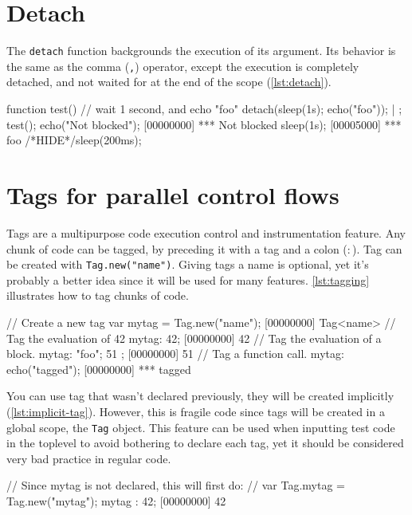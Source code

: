 \documentclass[openright,twoside,12pt]{report}
\begin{document}
\section{Detach}

The \texttt{detach} function backgrounds the execution of its
argument. Its behavior is the same as the comma (\texttt{,}) operator,
except the execution is completely detached, and not waited for at the
end of the scope (\autoref{lst:detach}).

\begin{urbiscript}[caption=Detach, label=lst:detach]
function test()
{
  // wait 1 second, and echo "foo"
  detach({sleep(1s); echo("foo")});
} | {};
test();
echo("Not blocked");
[00000000] *** Not blocked
sleep(1s);
[00005000] *** foo
/*HIDE*/sleep(200ms);
\end{urbiscript}

\section{Tags for parallel control flows}

Tags are a multipurpose code execution control and instrumentation
feature. Any chunk of code can be tagged, by preceding it with a tag
and a colon (\texttt{$:$}). Tag can be created with
\lstinline|Tag.new("name")|. Giving tags a name is optional, yet it's
probably a better idea since it will be used for many
features. \autoref{lst:tagging} illustrates how to tag chunks of code.

\begin{urbiscript}[caption=Tagging a block of code, label=lst:tagging]
// Create a new tag
var mytag = Tag.new("name");
[00000000] Tag<name>
// Tag the evaluation of 42
mytag: 42;
[00000000] 42
// Tag the evaluation of a block.
mytag: { "foo"; 51 };
[00000000] 51
// Tag a function call.
mytag: echo("tagged");
[00000000] *** tagged
\end{urbiscript}

You can use tag that wasn't declared previously, they will be created
implicitly (\autoref{lst:implicit-tag}). However, this is fragile code since
tags will be created in a global scope, the \texttt{Tag} object. This
feature can be used when inputting test code in the toplevel to avoid
bothering to declare each tag, yet it should be considered very bad
practice in regular code.

\begin{urbiscript}[caption=Tag created implicitly,
label=lst:implicit-tag]
// Since mytag is not declared, this will first do:
// var Tag.mytag = Tag.new("mytag");
mytag : 42;
[00000000] 42
\end{urbiscript}
\end{document}
